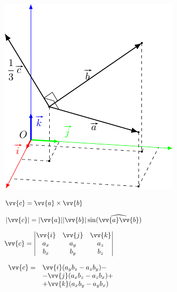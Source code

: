 \documentclass[10pt]{beamer}
\begin{document}
{
	{
		\includegraphics{vecpr.pdf}
		
		
	}
	{
		$\vv{c} = \vv{a} \times \vv{b} $
		
		$\ABS{\vv{c}} = |\vv{a}||\vv{b}|\sin( \widehat{\vv{a}\vv{b}} ) $
		
		
		\hfill	
		
		$\vv{c} = \begin{vmatrix}
			\vv{i} & \vv{j} & \vv{k} \\
			a_x & a_y & a_z          \\
			b_x & b_y & b_z          \\
		\end{vmatrix}$	
		
		
		\hfill
		
		\hfill
		
		
		$\begin{array}{rl}
			\vv{c} = & \vv{i}(a_yb_z-a_zb_y) - \\
			& - \vv{j}(a_xb_z-a_zb_x) + \\
			& + \vv{k}({a_xb_y-a_yb_x})
		\end{array}   $
	}
	
}

\end{document}
